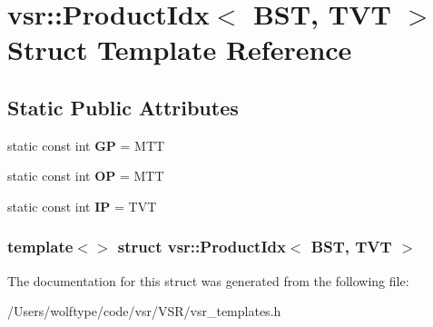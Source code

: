 \hypertarget{structvsr_1_1_product_idx_3_01_b_s_t_00_01_t_v_t_01_4}{\section{vsr\-:\-:Product\-Idx$<$ B\-S\-T, T\-V\-T $>$ Struct Template Reference}
\label{structvsr_1_1_product_idx_3_01_b_s_t_00_01_t_v_t_01_4}
}
\subsection*{Static Public Attributes}
\begin{DoxyCompactItemize}
\item 
\hypertarget{structvsr_1_1_product_idx_3_01_b_s_t_00_01_t_v_t_01_4_ace6cfb7c58217ce085ee1a547931a9eb}{static const int {\bfseries G\-P} = M\-T\-T}\label{structvsr_1_1_product_idx_3_01_b_s_t_00_01_t_v_t_01_4_ace6cfb7c58217ce085ee1a547931a9eb}

\item 
\hypertarget{structvsr_1_1_product_idx_3_01_b_s_t_00_01_t_v_t_01_4_aaa77d1ffbc2b0e4a40eebf1f4f99cb25}{static const int {\bfseries O\-P} = M\-T\-T}\label{structvsr_1_1_product_idx_3_01_b_s_t_00_01_t_v_t_01_4_aaa77d1ffbc2b0e4a40eebf1f4f99cb25}

\item 
\hypertarget{structvsr_1_1_product_idx_3_01_b_s_t_00_01_t_v_t_01_4_a0a1521909302ba2a053f18987654e6f8}{static const int {\bfseries I\-P} = T\-V\-T}\label{structvsr_1_1_product_idx_3_01_b_s_t_00_01_t_v_t_01_4_a0a1521909302ba2a053f18987654e6f8}

\end{DoxyCompactItemize}
\subsubsection*{template$<$$>$ struct vsr\-::\-Product\-Idx$<$ B\-S\-T, T\-V\-T $>$}



The documentation for this struct was generated from the following file\-:\begin{DoxyCompactItemize}
\item 
/\-Users/wolftype/code/vsr/\-V\-S\-R/vsr\-\_\-templates.\-h\end{DoxyCompactItemize}
